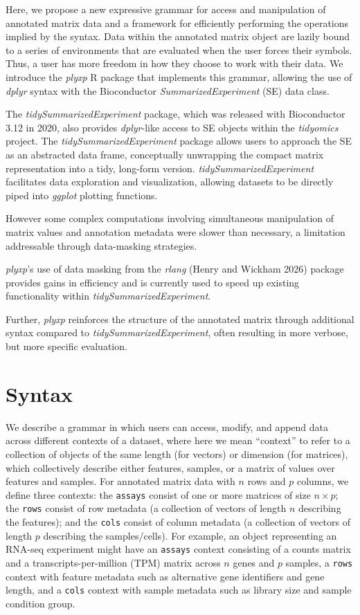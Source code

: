 \documentclass[
  letterpaper,
  DIV=11,
  numbers=noendperiod]{scrartcl}
\begin{document}
Here, we propose a new expressive grammar for access and manipulation of
annotated matrix data and a framework for efficiently performing the
operations implied by the syntax. Data within the annotated matrix
object are lazily bound to a series of environments that are evaluated
when the user forces their symbols. Thus, a user has more freedom in how
they choose to work with their data. We introduce the \emph{plyxp} R
package that implements this grammar, allowing the use of \emph{dplyr}
syntax with the Bioconductor \emph{SummarizedExperiment} (SE) data
class.

The \emph{tidySummarizedExperiment} package, which was released with
Bioconductor 3.12 in 2020, also provides \emph{dplyr}-like access to SE
objects within the \emph{tidyomics} project. The
\emph{tidySummarizedExperiment} package allows users to approach the SE
as an abstracted data frame, conceptually unwrapping the compact matrix
representation into a tidy, long-form version.
\emph{tidySummarizedExperiment} facilitates data exploration and
visualization, allowing datasets to be directly piped into \emph{ggplot}
plotting functions.

However some complex computations involving simultaneous manipulation of
matrix values and annotation metadata were slower than necessary, a
limitation addressable through data-masking strategies.

\emph{plyxp}'s use of data masking from the \emph{rlang} (Henry and
Wickham 2026) package provides gains in efficiency and is currently used
to speed up existing functionality within
\emph{tidySummarizedExperiment}.

Further, \emph{plyxp} reinforces the structure of the annotated matrix
through additional syntax compared to \emph{tidySummarizedExperiment},
often resulting in more verbose, but more specific evaluation.

\section{Syntax}\label{syntax}

We describe a grammar in which users can access, modify, and append data
across different contexts of a dataset, where here we mean ``context''
to refer to a collection of objects of the same length (for vectors) or
dimension (for matrices), which collectively describe either features,
samples, or a matrix of values over features and samples. For annotated
matrix data with \(n\) rows and \(p\) columns, we define three contexts:
the \texttt{assays} consist of one or more matrices of size
\(n \times p\); the \texttt{rows} consist of row metadata (a collection
of vectors of length \(n\) describing the features); and the
\texttt{cols} consist of column metadata (a collection of vectors of
length \(p\) describing the samples/cells). For example, an object
representing an RNA-seq experiment might have an \texttt{assays} context
consisting of a counts matrix and a transcripts-per-million (TPM) matrix
across \(n\) genes and \(p\) samples, a \texttt{rows} context with
feature metadata such as alternative gene identifiers and gene length,
and a \texttt{cols} context with sample metadata such as library size
and sample condition group.
\end{document}
